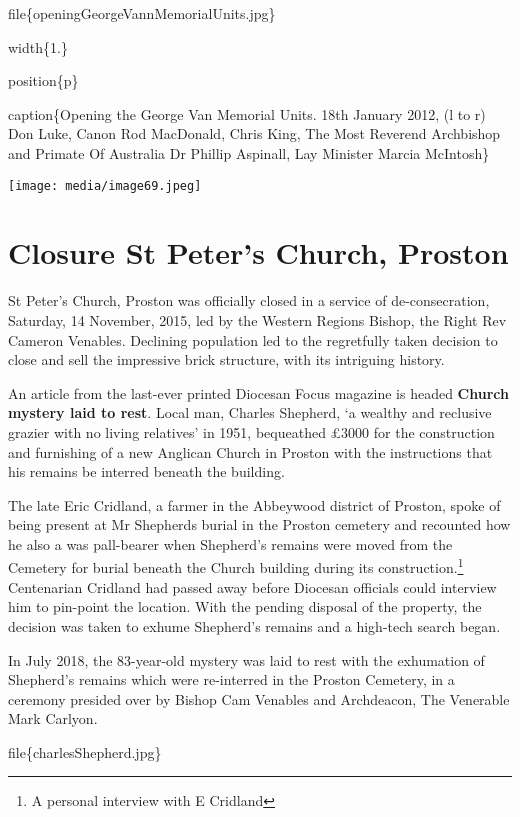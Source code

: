 file\{openingGeorgeVannMemorialUnits.jpg\}

width\{1.\}

position\{p\}

caption\{Opening the George Van Memorial Units. 18th January 2012, (l to r) Don Luke, Canon Rod MacDonald, Chris King, The Most Reverend Archbishop and Primate Of Australia Dr Phillip Aspinall, Lay Minister Marcia McIntosh\}

\texttt{[image: media/image69.jpeg]}

\hypertarget{closure-st-peters-church-proston}{%
\section{Closure St Peter's Church, Proston}\label{closure-st-peters-church-proston}}

St Peter's Church, Proston was officially closed in a service of de-consecration, Saturday, 14 November, 2015, led by the Western Regions Bishop, the Right Rev Cameron Venables. Declining population led to the regretfully taken decision to close and sell the impressive brick structure, with its intriguing history.

An article from the last-ever printed Diocesan Focus magazine is headed \textbf{Church mystery laid to rest}. Local man, Charles Shepherd, `a wealthy and reclusive grazier with no living relatives' in 1951, bequeathed £3000 for the construction and furnishing of a new Anglican Church in Proston with the instructions that his remains be interred beneath the building.

The late Eric Cridland, a farmer in the Abbeywood district of Proston, spoke of being present at Mr Shepherds burial in the Proston cemetery and recounted how he also a was pall-bearer when Shepherd's remains were moved from the Cemetery for burial beneath the Church building during its construction.\footnote{A personal interview with E Cridland} Centenarian Cridland had passed away before Diocesan officials could interview him to pin-point the location. With the pending disposal of the property, the decision was taken to exhume Shepherd's remains and a high-tech search began.

In July 2018, the 83-year-old mystery was laid to rest with the exhumation of Shepherd's remains which were re-interred in the Proston Cemetery, in a ceremony presided over by Bishop Cam Venables and Archdeacon, The Venerable Mark Carlyon.

file\{charlesShepherd.jpg\}

